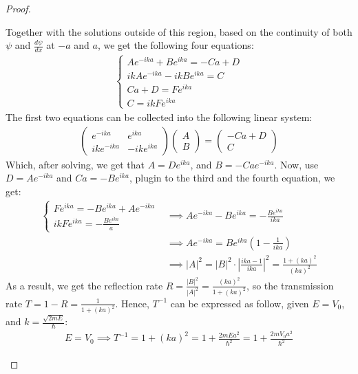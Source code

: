 \documentclass{article}
\begin{document}
\begin{proof}
\begin{enumerate}
        Together with the solutions outside of this region, based on the continuity of both $\psi$ and $\frac{d\psi}{dx}$ at $-a$ and $a$, we get the following four equations:
        \begin{align}
            \begin{cases}
                Ae^{-ika}+Be^{ika}=-Ca+D\\
                ikAe^{-ika}-ikBe^{ika}=C\\
                Ca+D = Fe^{ika}\\
                C=ikFe^{ika}
            \end{cases}
        \end{align}
        The first two equations can be collected into the following linear system:
        \begin{align}
            \begin{pmatrix}
                e^{-ika}&e^{ika}\\ ike^{-ika}&-ike^{ika}
            \end{pmatrix}\begin{pmatrix}
                A\\B
            \end{pmatrix}=\begin{pmatrix}
                -Ca+D\\C
            \end{pmatrix}
        \end{align}
        Which, after solving, we get that $A=De^{ika}$, and $B=-Cae^{-ika}$. Now, use $D=Ae^{-ika}$ and $Ca = -Be^{ika}$, plugin to the third and the fourth equation, we get:
        \begin{align}
            \begin{cases}
                Fe^{ika} = -Be^{ika}+Ae^{-ika}\\
                ikFe^{ika} = -\frac{Be^{ika}}{a}
            \end{cases}&\implies Ae^{-ika}-Be^{ika} = -\frac{Be^{ika}}{ika}\\
            &\implies Ae^{-ika} = Be^{ika}\left(1-\frac{1}{ika}\right)\\
            &\implies |A|^2 = |B|^2\cdot\left|\frac{ika-1}{ika}\right|^2 = \frac{1+(ka)^2}{(ka)^2}
        \end{align}
        As a result, we get the reflection rate $R=\frac{|B|^2}{|A|^2} = \frac{(ka)^2}{1+(ka)^2}$, so the transmission rate $T=1-R = \frac{1}{1+(ka)^2}$. Hence, $T^{-1}$ can be expressed as follow, given $E=V_0$, and $k=\frac{\sqrt{2mE}}{\hbar}$:
        \begin{align}
            E=V_0\implies T^{-1} = 1+(ka)^2 = 1+\frac{2mEa^2}{\hbar^2} = 1+\frac{2mV_0a^2}{\hbar^2}
        \end{align}
        

\end{enumerate}
\end{proof}
\end{document}
